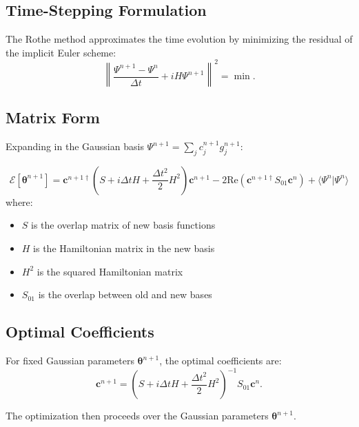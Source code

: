 \documentclass[11pt,a4paper]{article}
\newcommand{\re}{\mathrm{Re}}
\theoremstyle{definition}
\begin{document}
\subsection{Time-Stepping Formulation}

The Rothe method approximates the time evolution by minimizing the residual of the implicit Euler scheme:
\begin{equation}
\left\| \frac{\Psi^{n+1} - \Psi^n}{\Delta t} + i H \Psi^{n+1} \right\|^2 = \min.
\end{equation}

\subsection{Matrix Form}

Expanding in the Gaussian basis $\Psi^{n+1} = \sum_j c_j^{n+1} g_j^{n+1}$:

\begin{tcolorbox}[colback=gray!5,colframe=gray!50!black,title=Rothe Error Functional]
\begin{equation}
\mathcal{E}[\bm{\theta}^{n+1}] = \bm{c}^{n+1\dagger} \left( S + i\Delta t H + \frac{\Delta t^2}{2} H^2 \right) \bm{c}^{n+1} - 2\re\left( \bm{c}^{n+1\dagger} S_{01} \bm{c}^n \right) + \langle \Psi^n | \Psi^n \rangle
\end{equation}
where:
\begin{itemize}
    \item $S$ is the overlap matrix of new basis functions
    \item $H$ is the Hamiltonian matrix in the new basis
    \item $H^2$ is the squared Hamiltonian matrix
    \item $S_{01}$ is the overlap between old and new bases
\end{itemize}
\end{tcolorbox}

\subsection{Optimal Coefficients}

For fixed Gaussian parameters $\bm{\theta}^{n+1}$, the optimal coefficients are:
\begin{equation}
\bm{c}^{n+1} = \left( S + i\Delta t H + \frac{\Delta t^2}{2} H^2 \right)^{-1} S_{01} \bm{c}^n.
\end{equation}

The optimization then proceeds over the Gaussian parameters $\bm{\theta}^{n+1}$.
\end{document}
